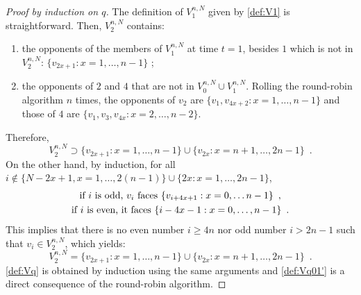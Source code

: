 \begin{proof}[Proof by induction on $q$]
The definition of $V_{1}^{n,N}$ given by \eqref{def:V1} is straightforward. Then, $V_{2}^{n,N}$ contains:
\begin{enumerate}[-]
\item  the opponents of the members of $V_{1}^{n,N}$ at time $t=1$, besides $1$ which is not in $V_{2}^{n,N}$: $\{v_{2x+1} : x=1,\ldots,n-1\}$ ;
\item the opponents of $2$ and $4$ that are not in $V_{0}^{n,N}\cup V_{1}^{n,N}$. Rolling the round-robin algorithm $n$ times,  the opponents of $v_2$ are $\{v_1,v_{4x+2} : x=1,\ldots,n-1\}$ and those of $4$ are $\{v_1,v_3,v_{4x} : x=2,\ldots,n-2\}$. 
\end{enumerate}
Therefore, 
\[
V_{2}^{n,N}\supset \{v_{2x+1} : x=1,\ldots,n-1\}\cup\{v_{2x} : x=n+1,\ldots,2n-1\}\enspace.
\]
On the other hand, by induction,  for all $i\notin \{N-2x+1, x=1,\ldots,2(n-1)\}\cup \{2x : x=1,\ldots, 2n-1\}$,
\begin{gather}
\notag\text{if }i \text{ is odd, $v_i$ faces }\{v_{i+4x+1} : x=0,\ldots n-1\}\enspace,\\
\label{eq:Opponents}\text{if }i \text{ is even, it faces }\{i-4x-1 : x=0,\ldots,n-1\}\enspace.
\end{gather}
This implies that there is no even number $i\ge 4n$ nor odd number $i>2n-1$ such that $v_i\in V_{2}^{n,N}$, which yields:
\begin{equation*}
 V_{2}^{n,N}= \{v_{2x+1} : x=1,\ldots,n-1\}\cup\{v_{2x} : x=n+1,\ldots,2n-1\}\enspace.
\end{equation*}
\eqref{def:Vq} is obtained by induction using the same arguments and
\eqref{def:Vq01'} is a direct consequence of the round-robin algorithm. 
\end{proof}
%
